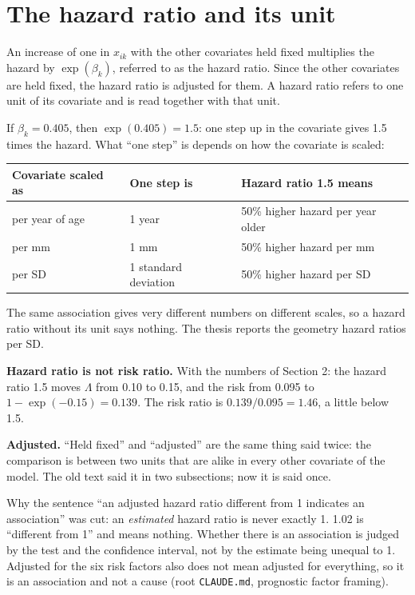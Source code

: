 \documentclass[11pt]{article}
\begin{document}
\section{The hazard ratio and its unit}

\begin{thesisline}
An increase of one in $x_{ik}$ with the other covariates held fixed multiplies the hazard by
$\exp(\beta_k)$, referred to as the hazard ratio. Since the other covariates are held fixed, the
hazard ratio is adjusted for them. A hazard ratio refers to one unit of its covariate and is read
together with that unit.
\end{thesisline}

If $\beta_k = 0.405$, then $\exp(0.405) = 1.5$: one step up in the covariate gives 1.5 times the
hazard. What ``one step'' is depends on how the covariate is scaled:

\begin{center}
\begin{tabular}{lll}
\toprule
Covariate scaled as & One step is & Hazard ratio 1.5 means \\
\midrule
per year of age & 1 year & 50\% higher hazard per year older \\
per mm & 1 mm & 50\% higher hazard per mm \\
per SD & 1 standard deviation & 50\% higher hazard per SD \\
\bottomrule
\end{tabular}
\end{center}

The same association gives very different numbers on different scales, so a hazard ratio without
its unit says nothing. The thesis reports the geometry hazard ratios per SD.

\textbf{Hazard ratio is not risk ratio.} With the numbers of Section 2: the hazard ratio 1.5 moves
$\Lambda$ from 0.10 to 0.15, and the risk from 0.095 to $1 - \exp(-0.15) = 0.139$. The risk ratio is
$0.139 / 0.095 = 1.46$, a little below 1.5.

\textbf{Adjusted.} ``Held fixed'' and ``adjusted'' are the same thing said twice: the comparison is
between two units that are alike in every other covariate of the model. The old text said it in two
subsections; now it is said once.

\begin{mine}
Why the sentence ``an adjusted hazard ratio different from 1 indicates an association'' was cut: an
\emph{estimated} hazard ratio is never exactly 1. 1.02 is ``different from 1'' and means nothing.
Whether there is an association is judged by the test and the confidence interval, not by the
estimate being unequal to 1. Adjusted for the six risk factors also does not mean adjusted for
everything, so it is an association and not a cause (root \texttt{CLAUDE.md}, prognostic factor
framing).
\end{mine}
\end{document}
